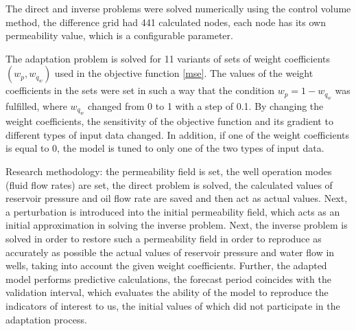 \documentclass[
11pt,%
tightenlines,%
twoside,%
onecolumn,%
nofloats,%
nobibnotes,%
nofootinbib,%
superscriptaddress,%
noshowpacs,%
centertags]%
{revtex4}
\begin{document}
The direct and inverse problems were solved numerically using the control volume method, the difference grid had 441 calculated nodes, each node has its own permeability value, which is a configurable parameter.

The adaptation problem is solved for 11 variants of sets of weight coefficients $(w_p, w_{q_w})$ used in the objective function {\ref{mse}}. The values of the weight coefficients in the sets were set in such a way that the condition $w_p = 1 - w_{q_w}$ was fulfilled, where $w_{q_w}$ changed from 0 to 1 with a step of 0.1. By changing the weight coefficients, the sensitivity of the objective function and its gradient to different types of input data changed. In addition, if one of the weight coefficients is equal to 0, the model is tuned to only one of the two types of input data.

Research methodology: the permeability field is set, the well operation modes (fluid flow rates) are set, the direct problem is solved, the calculated values of reservoir pressure and oil flow rate are saved and then act as actual values. Next, a perturbation is introduced into the initial permeability field, which acts as an initial approximation in solving the inverse problem. Next, the inverse problem is solved in order to restore such a permeability field in order to reproduce as accurately as possible the actual values of reservoir pressure and water flow in wells, taking into account the given weight coefficients. Further, the adapted model performs predictive calculations, the forecast period coincides with the validation interval, which evaluates the ability of the model to reproduce the indicators of interest to us, the initial values of which did not participate in the adaptation process.
\end{document}
